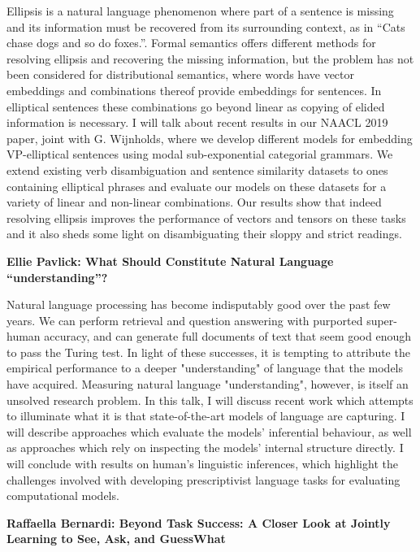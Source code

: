 \documentclass[a4paper,11pt,oneside]{book}
\begin{document}
Ellipsis is a natural language phenomenon where part of a sentence is missing and its information must be recovered from its surrounding context, as in ``Cats chase dogs and so do foxes.''. Formal semantics offers different methods for resolving ellipsis and recovering the missing information, but the problem has not been considered for distributional semantics, where words have vector embeddings and combinations thereof provide embeddings for sentences. In elliptical sentences these combinations go beyond linear as copying of elided information is necessary. I will talk about recent results in our NAACL 2019 paper, joint with G. Wijnholds, where we develop different models for embedding VP-elliptical sentences using modal sub-exponential categorial grammars. We extend existing verb disambiguation and sentence similarity datasets to ones containing elliptical phrases and evaluate our models on these datasets for a variety of linear and non-linear combinations. Our results show that indeed resolving ellipsis improves the performance of vectors and tensors on these tasks and it also sheds some light on disambiguating their sloppy and strict  readings.

\bigskip

\textbf{Ellie Pavlick: What Should Constitute Natural Language ``understanding''?}

Natural language processing has become indisputably good over the past few years. We can perform retrieval and question answering with purported super-human accuracy, and can generate full documents of text that seem good enough to pass the Turing test. In light of these successes, it is tempting to attribute the empirical performance to a deeper "understanding" of language that the models have acquired. Measuring natural language "understanding", however, is itself an unsolved research problem. In this talk, I will discuss recent work which attempts to illuminate what it is that state-of-the-art models of language are capturing. I will describe approaches which evaluate the models' inferential behaviour, as well as approaches which rely on inspecting the models' internal structure directly. I will conclude with results on human's linguistic inferences, which highlight the challenges involved with developing prescriptivist language tasks for evaluating computational models. 

\bigskip

\textbf{Raffaella Bernardi: Beyond Task Success: A Closer Look at Jointly Learning to See, Ask,
and GuessWhat}
\end{document}
